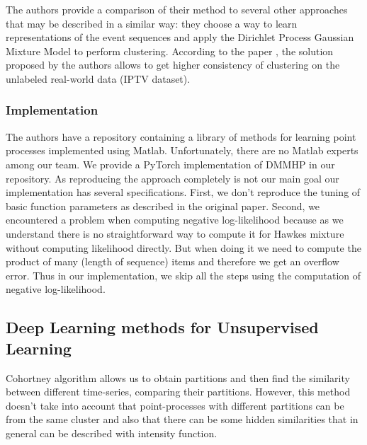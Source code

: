 \documentclass[10pt]{article}
\begin{document}
The authors provide a comparison of their method to several other approaches that may be described in a similar way: they choose a way to learn representations of the event sequences and apply the Dirichlet Process Gaussian Mixture Model \cite{krueger2018dirichlet} to perform clustering. According to the paper \cite{123dirichlet}, the solution proposed by the authors allows to get higher consistency of clustering on the unlabeled real-world data (IPTV dataset). 




\subsubsection{Implementation}
The authors have a repository containing a library of methods for learning point processes implemented using Matlab. Unfortunately, there are no Matlab experts among our team. We provide a PyTorch implementation of DMMHP in our repository. As reproducing the approach completely is not our main goal our implementation has several specifications. First, we don't reproduce the tuning of basic function parameters as described in the original paper. Second, we encountered a problem when computing negative log-likelihood because as we understand there is no straightforward way to compute it for Hawkes mixture without computing likelihood directly. But when doing it we need to compute the product of many (length of sequence) items and therefore we get an overflow error. Thus in our implementation, we skip all the steps using the computation of negative log-likelihood. 

\subsection{Deep Learning methods for Unsupervised Learning}
Cohortney algorithm allows us to obtain partitions and then find the similarity between different time-series, comparing their partitions. However, this method doesn't take into account that point-processes with different partitions can be from the same cluster and also that there can be some hidden similarities that in general can be described with intensity function.
\end{document}
